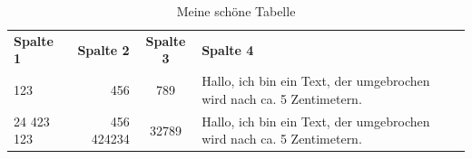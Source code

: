 \documentclass[12pt,ngerman,parskip=half]{scrartcl}
\begin{document}
\begin{table}
\caption{Meine schöne Tabelle}\label{tab:erste}
\begin{center}
\begin{tabular}{lrcp{5cm}} \toprule[2pt]
\textbf{Spalte 1} & {\bfseries Spalte 2}  & \textbf{Spalte 3}  & \textbf{Spalte 4}  \\ \cmidrule[1pt](rl){1-4}
123 & 456 & 789  & Hallo, ich bin ein Text, der umgebrochen wird nach ca. 5 Zentimetern. \\ \midrule
24 423 123 & 456 424234 &  32789  & Hallo, ich bin ein Text, der umgebrochen wird nach ca. 5 Zentimetern. \\ \bottomrule[2pt]
\end{tabular} 
\end{center}
\end{table}

\blindtext
\end{document}
